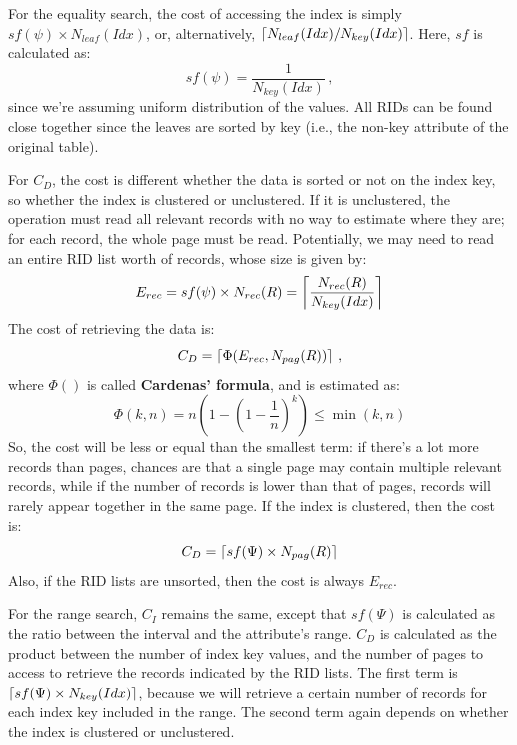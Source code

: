 For the equality search, the cost of accessing the index is simply $sf(\psi) \times N_{leaf}(Idx)$, or, alternatively, $\left\lceil N_{leaf}(Idx) / N_{key}(Idx)\right\rceil$. Here, $sf$ is calculated as:
\begin{equation*}
    sf(\psi) = \dfrac{1}{N_{key}(Idx)} \,,
\end{equation*}
since we're assuming uniform distribution of the values. All RIDs can be found close together since the leaves are sorted by key (i.e., the non-key attribute of the original table).

For $C_D$, the cost is different whether the data is sorted or not on the index key, so whether the index is clustered or unclustered. If it is unclustered, the operation must read all relevant records with no way to estimate where they are; for each record, the whole page must be read. Potentially, we may need to read an entire RID list worth of records, whose size is given by:
\begin{equation*}
    E_{rec} = sf(\psi) \times N_{rec}(R) = \left\lceil\dfrac{N_{rec}(R)}{N_{key}(Idx)}\right\rceil
\end{equation*}
The cost of retrieving the data is:
\begin{equation*}
    C_D = \left\lceil\Phi(E_{rec}, N_{pag}(R))\right\rceil \,,
\end{equation*}
where $\Phi()$ is called \textbf{Cardenas' formula}, and is estimated as:
\begin{equation*}
    \Phi(k,n) = n(1 - (1 - \dfrac{1}{n})^k) \leq \min(k,n)
\end{equation*}
So, the cost will be less or equal than the smallest term: if there's a lot more records than pages, chances are that a single page may contain multiple relevant records, while if the number of records is lower than that of pages, records will rarely appear together in the same page. If the index is clustered, then the cost is:
\begin{equation*}
    C_D = \left\lceil sf(\Psi) \times N_{pag}(R)\right\rceil 
\end{equation*}
Also, if the RID lists are unsorted, then the cost is always $E_{rec}$.

For the range search, $C_I$ remains the same, except that $sf(\Psi)$ is calculated as the ratio between the interval and the attribute's range. $C_D$ is calculated as the product between the number of index key values, and the number of pages to access to retrieve the records indicated by the RID lists. The first term is $\left\lceil sf(\Psi) \times N_{key}(Idx)\right\rceil$, because we will retrieve a certain number of records for each index key included in the range. The second term again depends on whether the index is clustered or unclustered.

